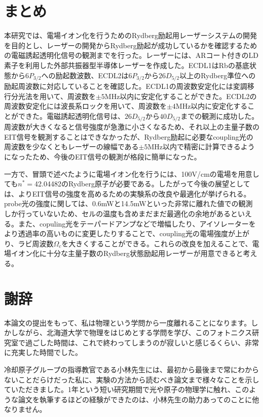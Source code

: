 \documentclass[dvipdfmx]{jsreport}
\begin{document}
\clearpage
\chapter{まとめ}
本研究では、電場イオン化を行うためのRydberg励起用レーザーシステムの開発を目的とし、レーザーの開発からRydberg励起が成功しているかを確認するための電磁誘起透明化信号の観測までを行った。レーザーには、ARコート付きのLD素子を利用した外部共振器型半導体レーザーを作成した。ECDL1はRbの基底状態から$6P_{3/2}$への励起数波数、ECDL2は$6P_{3/2}$から$26D_{5/2}$以上のRydberg準位への励起周波数に対応していることを確認した。ECDL1の周波数安定化には変調移行分光法を用いて、周波数を$\pm5$MHz以内に安定化することができた。ECDL2の周波数安定化には波長系ロックを用いて、周波数を$\pm4$MHz以内に安定化することができた。電磁誘起透明化信号は、$26D_{5/2}$から$40D_{5/2}$までの観測に成功した。周波数が大きくなると信号強度が急激に小さくなるため、それ以上の主量子数のEIT信号を観測することはできなかったが、Rydberg励起に必要なcoupling光の周波数を少なくともレーザーの線幅である$\pm5$MHz以内で精密に計算できるようになったため、今後のEIT信号の観測が格段に簡単になった。

一方で、冒頭で述べたように電場イオン化を行うには、100V/cmの電場を用意しても$n^*=$42.04482のRydberg原子が必要である。したがって今後の展望としては、よりEIT信号の強度を高めるための実験系の改良や最適化が挙げられる。probe光の強度に関しては、0.6mWと14.5mWといった非常に離れた値での観測しか行っていないため、セルの温度も含めまだまだ最適化の余地があるといえる。また、copuling光をテーパードアンプなどで増幅したり、アイソレーターをより透過率の高いものに変更したりすることで、coupling光の電場強度が上がり、ラビ周波数$\Omega_c$を大きくすることができる。これらの改良を加えることで、電場イオン化に十分な主量子数のRydberg状態励起用レーザーが用意できると考える。



\chapter*{謝辞}
本論文の提出をもって、私は物理という学問から一度離れることになります。しかしながら、北海道大学で物理をはじめとする学問を学び、このフォトニクス研究室で過ごした時間は、これで終わってしまうのが寂しいと感じるくらい、非常に充実した時間でした。

冷却原子グループの指導教官である小林先生には、最初から最後まで常にわからないことだらけだった私に、実験の方法から読むべき論文まで様々なことを示していただきました。1年という短い研究期間で光や原子の物理学に触れ、このような論文を執筆するほどの経験ができたのは、小林先生の助力あってのことに他なりません。
\end{document}
